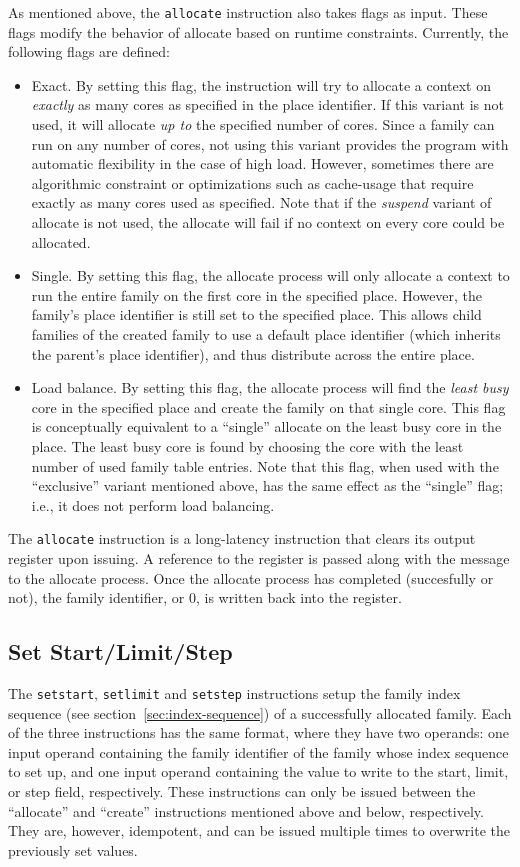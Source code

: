 As mentioned above, the {\tt allocate} instruction also takes flags as input. These flags modify the behavior of allocate based on runtime constraints. Currently, the following flags are defined:
\begin{itemize}
\item Exact. By setting this flag, the instruction will try to allocate a context on \emph{exactly} as many cores as specified in the place identifier. If this variant is not used, it will allocate \emph{up to} the specified number of cores. Since a family can run on any number of cores, not using this variant provides the program with automatic flexibility in the case of high load. However, sometimes there are algorithmic constraint or optimizations such as cache-usage that require exactly as many cores used as specified. Note that if the \emph{suspend} variant of allocate is not used, the allocate will fail if no context on every core could be allocated.
\item Single. By setting this flag, the allocate process will only allocate a context to run the entire family on the first core in the specified place. However, the family's place identifier is still set to the specified place. This allows child families of the created family to use a default place identifier (which inherits the parent's place identifier), and thus distribute across the entire place.
\item Load balance. By setting this flag, the allocate process will find the \emph{least busy} core in the specified place and create the family on that single core. This flag is conceptually equivalent to a ``single'' allocate on the least busy core in the place. The least busy core is found by choosing the core with the least number of used family table entries. Note that this flag, when used with the ``exclusive'' variant mentioned above, has the same effect as the ``single'' flag; i.e., it does not perform load balancing.
\end{itemize}

The {\tt allocate} instruction is a long-latency instruction that clears its output register upon issuing. A reference to the register is passed along with the message to the allocate process. Once the allocate process has completed (succesfully or not), the family identifier, or 0, is written back into the register.

\subsection{Set Start/Limit/Step}
The {\tt setstart}, {\tt setlimit} and {\tt setstep} instructions setup the family index sequence (see section~\ref{sec:index-sequence}) of a successfully allocated family. Each of the three instructions has the same format, where they have two operands: one input operand containing the family identifier of the family whose index sequence to set up, and one input operand containing the value to write to the start, limit, or step field, respectively. These instructions can only be issued between the ``allocate'' and ``create'' instructions mentioned above and below, respectively. They are, however, idempotent, and can be issued multiple times to overwrite the previously set values.

